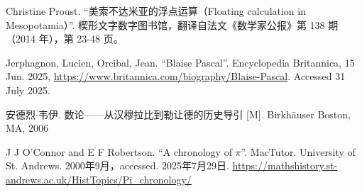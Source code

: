 Christine Proust. ``美索不达米亚的浮点运算（Floating calculation in Mesopotamia）''. 楔形文字数字图书馆，翻译自法文《数学家公报》第 138 期（2014 年），第 23-48 页。


Jerphagnon, Lucien, Orcibal, Jean. ``Blaise Pascal''. Encyclopedia Britannica, 15 Jun. 2025, \url{https://www.britannica.com/biography/Blaise-Pascal}. Accessed 31 July 2025.

安德烈$\cdot$韦伊. 数论——从汉穆拉比到勒让德的历史导引 [M]. Birkhäuser Boston, MA, 2006 %

J J O'Connor and E F Robertson. ``A chronology of $\pi$''. MacTutor. University of St. Andrews. 2000年9月，accessed. 2025年7月29日. \url{https://mathshistory.st-andrews.ac.uk/HistTopics/Pi_chronology/}
